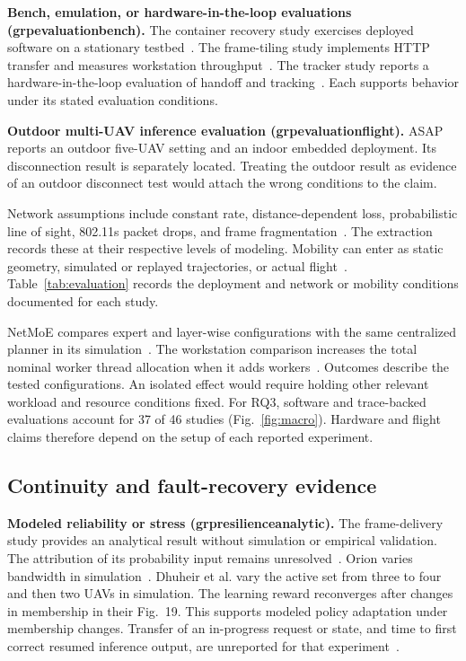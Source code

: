 \documentclass[journal]{IEEEtran}
\newcommand{\groupcite}[2]{\csname grp#1#2\endcsname}
\begin{document}
\textbf{Bench, emulation, or hardware-in-the-loop evaluations (\groupcite{evaluation}{bench}).}
The container recovery study exercises deployed software on a stationary testbed~\cite{R0038}. The frame-tiling study implements HTTP transfer and measures workstation throughput~\cite{R0125}. The tracker study reports a hardware-in-the-loop evaluation of handoff and tracking~\cite{R0292}. Each supports behavior under its stated evaluation conditions.

\textbf{Outdoor multi-UAV inference evaluation (\groupcite{evaluation}{flight}).}
ASAP reports an outdoor five-UAV setting and an indoor embedded deployment. Its disconnection result is separately located. Treating the outdoor result as evidence of an outdoor disconnect test would attach the wrong conditions to the claim.

Network assumptions include constant rate, distance-dependent loss, probabilistic line of sight, 802.11s packet drops, and frame fragmentation~\cite{R0015,R0022,R0073,R0083,R0121}. The extraction records these at their respective levels of modeling. Mobility can enter as static geometry, simulated or replayed trajectories, or actual flight~\cite{R0003,R0014,R0074}. Table~\ref{tab:evaluation} records the deployment and network or mobility conditions documented for each study.

NetMoE compares expert and layer-wise configurations with the same centralized planner in its simulation~\cite{R0118}. The workstation comparison increases the total nominal worker thread allocation when it adds workers~\cite{R0125}. Outcomes describe the tested configurations. An isolated effect would require holding other relevant workload and resource conditions fixed. For RQ3, software and trace-backed evaluations account for 37 of 46 studies (Fig.~\ref{fig:macro}). Hardware and flight claims therefore depend on the setup of each reported experiment.

\subsection{Continuity and fault-recovery evidence}
\textbf{Modeled reliability or stress (\groupcite{resilience}{analytic}).}
The frame-delivery study provides an analytical result without simulation or empirical validation. The attribution of its probability input remains unresolved~\cite{R0121}. Orion varies bandwidth in simulation~\cite{R0074}. Dhuheir et al. vary the active set from three to four and then two UAVs in simulation. The learning reward reconverges after changes in membership in their Fig.~19. This supports modeled policy adaptation under membership changes. Transfer of an in-progress request or state, and time to first correct resumed inference output, are unreported for that experiment~\cite{R0019}.
\end{document}
